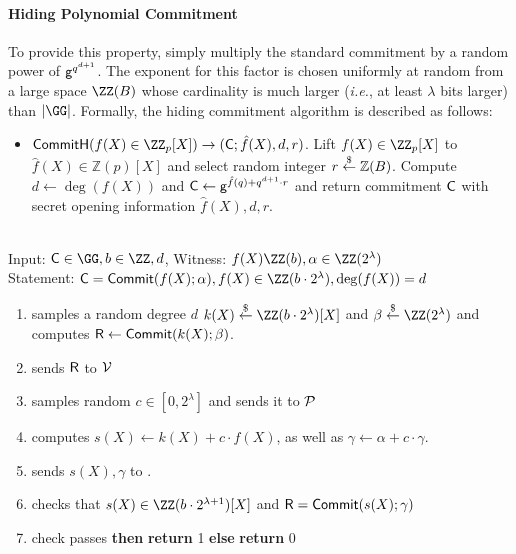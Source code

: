 \paragraph{Hiding Polynomial Commitment}
To provide this property, simply multiply the standard commitment by a random power of $\mathsf{g}^{q^{d+1}}$. The exponent for this factor is chosen uniformly at random from a large space $\ZZ(B)$ whose cardinality is much larger (\emph{i.e.}, at least $\lambda$ bits larger) than $|\GG|$. Formally, the hiding commitment algorithm is described as follows:
\begin{itemize}
	\item $\pro{CommitH}(f(X) \in \ZZ_p[X]) \rightarrow (\gr{C}; \hat{f}(X), d, r)$. Lift $f(X) \in \ZZ_p[X]$ to $\hat{f}(X) \in \mathbb{Z}(p)[X]$ and select random integer $r \overset{\$}{\gets} \mathbb{Z}(B)$. Compute $d \gets \deg(f(X))$ and $\mathsf{C} \gets \mathsf{g}^{\hat{f}(q)+q^{d+1} \cdot r}$ and return commitment $\mathsf{C}$ with secret opening information $\hat{f}(X), d, r$.
\end{itemize}
 \noindent\begin{mdframed}[userdefinedwidth=\textwidth]
\begin{minipage}{\textwidth}
	\begin{flushleft}
	\\
	Input: $\gr{C} \in \GG,b\in \ZZ,d$, Witness: $f(X) \ZZ(b),\alpha \in \ZZ(2^\lambda)$\\
	Statement: $\gr{C}=\commit(f(X);\alpha),f(X) \in \ZZ(b\cdot 2^\lambda),\deg(f(X))=d$
	\begin{enumerate}[nolistsep]
		    \item \prover samples a random degree $d$ $k(X) \sample \ZZ(b\cdot 2^\lambda)[X]$ and $\beta \sample \ZZ(2^\lambda)$ and computes $\mathsf{R}\gets \textsf{{Commit}}(k(X);\beta)$.
		    \item \prover sends $\mathsf{R}$ to $\mathcal{V}$
		    \item \verifier samples random $c\in [0,2^\lambda]$ and sends it to $\mathcal{P}$
		    \item \prover computes $s(X)\gets k(X) + c \cdot f(X)$, as well as $\gamma\gets \alpha+ c\cdot \gamma$. 
		    \item \prover sends $s(X),\gamma$ to \verifier.
		    \item \verifier checks that $s(X) \in \ZZ(b\cdot 2^{\lambda+1})[X] $ and $\mathsf{R}=\textsf{{Commit}}(s(X);\gamma)$
		    \item \pcif{}check passes \textbf{then} \textbf{return} 1 \textbf{else} \textbf{return} 0
		\end{enumerate}
	\end{flushleft}
\end{minipage}
\end{mdframed}

